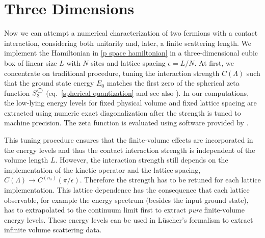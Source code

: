 \section{Three Dimensions}\label{sec:3D}

Now we can attempt a numerical characterization of two fermions with a contact interaction, considering both unitarity and, later, a finite scattering length.
We implement the Hamiltonian in \eqref{p space hamiltonian} in a three-dimensional cubic box of linear size $L$ with $N$ sites and lattice spacing $\epsilon=L/N$.
At first, we concentrate on traditional procedure, tuning the interaction strength $C(\Lambda)$ such that the ground state energy $E_0$ matches the first zero of the spherical zeta function $S^{\bigcirc}_3$ (eq.~\eqref{spherical quantization} and see also ).
In our computations, the low-lying energy levels for fixed physical volume and fixed lattice spacing are extracted using numeric exact diagonalization after the strength is tuned to machine precision.
The zeta function is evaluated using software provided by .

This tuning procedure ensures that the finite-volume effects are incorporated in the energy levels and thus the contact interaction strength is independent of the volume length $L$.
However, the interaction strength still depends on the implementation of the kinetic operator and the lattice spacing, $C(\Lambda)\to C^{(n_s)}(\pi/\epsilon)$.
Therefore the strength has to be retuned for each lattice implementation.
This lattice dependence has the consequence that each lattice observable, for example the energy spectrum (besides the input ground state), has to extrapolated to the continuum limit first to extract \textit{pure} finite-volume energy levels.
These energy levels can be used in L\"uscher's formalism to extract infinite volume scattering data.

